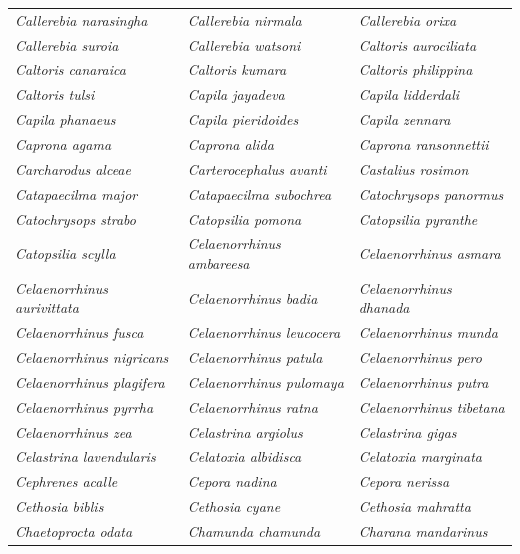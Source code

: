 \documentclass[runningheads]{llncs}
\begin{document}
\begin{longtable}{lll}
\textit{Callerebia narasingha} & \textit{Callerebia nirmala} & \textit{Callerebia orixa} \\
\textit{Callerebia suroia} & \textit{Callerebia watsoni} & \textit{Caltoris aurociliata} \\
\textit{Caltoris canaraica} & \textit{Caltoris kumara} & \textit{Caltoris philippina} \\
\textit{Caltoris tulsi} & \textit{Capila jayadeva} & \textit{Capila lidderdali} \\
\textit{Capila phanaeus} & \textit{Capila pieridoides} & \textit{Capila zennara} \\
\textit{Caprona agama} & \textit{Caprona alida} & \textit{Caprona ransonnettii} \\
\textit{Carcharodus alceae} & \textit{Carterocephalus avanti} & \textit{Castalius rosimon} \\
\textit{Catapaecilma major} & \textit{Catapaecilma subochrea} & \textit{Catochrysops panormus} \\
\textit{Catochrysops strabo} & \textit{Catopsilia pomona} & \textit{Catopsilia pyranthe} \\
\textit{Catopsilia scylla} & \textit{Celaenorrhinus ambareesa} & \textit{Celaenorrhinus asmara} \\
\textit{Celaenorrhinus aurivittata} & \textit{Celaenorrhinus badia} & \textit{Celaenorrhinus dhanada} \\
\textit{Celaenorrhinus fusca} & \textit{Celaenorrhinus leucocera} & \textit{Celaenorrhinus munda} \\
\textit{Celaenorrhinus nigricans} & \textit{Celaenorrhinus patula} & \textit{Celaenorrhinus pero} \\
\textit{Celaenorrhinus plagifera} & \textit{Celaenorrhinus pulomaya} & \textit{Celaenorrhinus putra} \\
\textit{Celaenorrhinus pyrrha} & \textit{Celaenorrhinus ratna} & \textit{Celaenorrhinus tibetana} \\
\textit{Celaenorrhinus zea} & \textit{Celastrina argiolus} & \textit{Celastrina gigas} \\
\textit{Celastrina lavendularis} & \textit{Celatoxia albidisca} & \textit{Celatoxia marginata} \\
\textit{Cephrenes acalle} & \textit{Cepora nadina} & \textit{Cepora nerissa} \\
\textit{Cethosia biblis} & \textit{Cethosia cyane} & \textit{Cethosia mahratta} \\
\textit{Chaetoprocta odata} & \textit{Chamunda chamunda} & \textit{Charana mandarinus} \\

\end{longtable}
\end{document}
